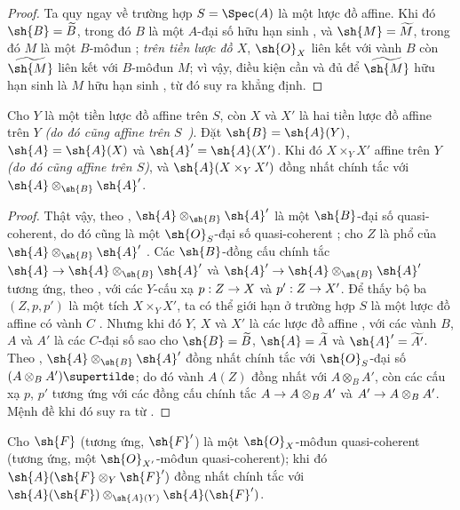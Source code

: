 \documentclass[oneside,10pt]{amsart}
\makeatletter
\newcommand{\ega@arrow}[2]{\mathchoice{#1}{#2}{#2}{#2}}
\renewcommand{\to}{\ega@arrow{\longrightarrow}{\rightarrow}}
\let\EGAOriginalLabel\label
\renewcommand{\label}[1]{\phantomsection\EGAOriginalLabel{#1}}
\makeatother
\begin{document}
\begin{proof}
Ta quy ngay về trường hợp $S=\Spec(A)$ là một lược đồ affine.
Khi đó $\sh{B}=\widetilde{B}$, trong đó $B$ là một $A$-đại số hữu hạn sinh , và $\sh{M}=\widetilde{M}$, trong đó $M$ là một $B$-môđun ; \emph{trên tiền lược đồ $X$}, $\sh{O}_X$ liên kết với vành $B$ còn $\widetilde{\sh{M}}$ liên kết với $B$-môđun $M$; vì vậy, điều kiện cần và đủ để $\widetilde{\sh{M}}$ hữu hạn sinh là $M$ hữu hạn sinh , từ đó suy ra khẳng định.
\end{proof}

\begin{proposition}[1.4.6]
\label{II.1.4.6}
Cho $Y$ là một tiền lược đồ affine trên $S$, còn $X$ và $X'$ là hai tiền lược đồ affine trên $Y$ \emph{(do đó cũng affine trên $S$~)}.
Đặt $\sh{B}=\sh{A}(Y)$, $\sh{A}=\sh{A}(X)$ và $\sh{A}'=\sh{A}(X')$.
Khi đó $X\times_Y X'$ affine trên $Y$ \emph{(do đó cũng affine trên $S$)}, và $\sh{A}(X\times_Y X')$ đồng nhất chính tắc với $\sh{A}\otimes_\sh{B}\sh{A}'$.
\end{proposition}

\begin{proof}
Thật vậy, theo , $\sh{A}\otimes_\sh{B}\sh{A}'$ là một $\sh{B}$-đại số quasi-coherent, do đó cũng là một $\sh{O}_S$-đại số quasi-coherent ; cho $Z$ là phổ của $\sh{A}\otimes_\sh{B}\sh{A}'$ .
Các $\sh{B}$-đồng cấu chính tắc $\sh{A}\to\sh{A}\otimes_\sh{B}\sh{A}'$ và $\sh{A}'\to\sh{A}\otimes_\sh{B}\sh{A}'$ tương ứng, theo , với các $Y$-cấu xạ $p:Z\to X$ và $p':Z\to X'$.
Để thấy bộ ba $(Z,p,p')$ là một tích $X\times_Y X'$, ta có thể giới hạn ở trường hợp $S$ là một lược đồ affine có vành $C$ .
Nhưng khi đó $Y$, $X$ và $X'$ là các lược đồ affine , với các vành $B$, $A$ và $A'$ là các $C$-đại số sao cho $\sh{B}=\widetilde{B}$, $\sh{A}=\widetilde{A}$ và $\sh{A}'=\widetilde{A'}$.
Theo , $\sh{A}\otimes_\sh{B}\sh{A}'$ đồng nhất chính tắc với $\sh{O}_S$-đại số $(A\otimes_B A')\supertilde$; do đó vành $A(Z)$ đồng nhất với $A\otimes_B A'$, còn các cấu xạ $p$, $p'$ tương ứng với các đồng cấu chính tắc $A\to A\otimes_B A'$ và $A'\to A\otimes_B A'$.
Mệnh đề khi đó suy ra từ .
\end{proof}

\begin{corollary}[1.4.7]
\label{II.1.4.7}
Cho $\sh{F}$ (tương ứng, $\sh{F}'$) là một $\sh{O}_X$-môđun quasi-coherent (tương ứng, một $\sh{O}_{X'}$-môđun quasi-coherent); khi đó $\sh{A}(\sh{F}\otimes_Y\sh{F}')$ đồng nhất chính tắc với $\sh{A}(\sh{F})\otimes_{\sh{A}(Y)}\sh{A}(\sh{F}')$.
\end{corollary}
\end{document}
